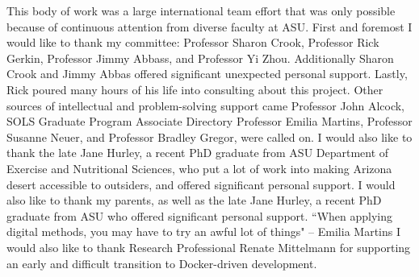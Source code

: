 This body of work was a large international team effort that was only possible because of continuous attention from diverse faculty at ASU. 
\linebreak 
\linebreak 
First and foremost I would like to thank my committee: Professor Sharon Crook, Professor Rick Gerkin, Professor Jimmy Abbass, and Professor Yi Zhou. 
Additionally Sharon Crook and Jimmy Abbas offered significant unexpected personal support.
Lastly, Rick poured many hours of his life into consulting about this project.
\linebreak 
\linebreak 
Other sources of intellectual and problem-solving support came Professor John Alcock, SOLS Graduate Program Associate Directory Professor Emilia Martins, Professor Susanne Neuer, and Professor Bradley Gregor, were called on.
\linebreak 
\linebreak 
I would also like to thank the late Jane Hurley, a recent PhD graduate from ASU Department of Exercise and Nutritional Sciences, who put a lot of work into making Arizona desert accessible to outsiders, and offered significant personal support.
\linebreak 
\linebreak 
I would also like to thank my parents, as well as the late Jane Hurley, a recent PhD graduate from ASU who offered significant personal support.
\linebreak 
\linebreak 
``When applying digital methods, you may have to try an awful lot of things" -- Emilia Martins
\linebreak 
\linebreak 
I would also like to thank Research Professional Renate Mittelmann for supporting an early and difficult transition to Docker-driven development.
